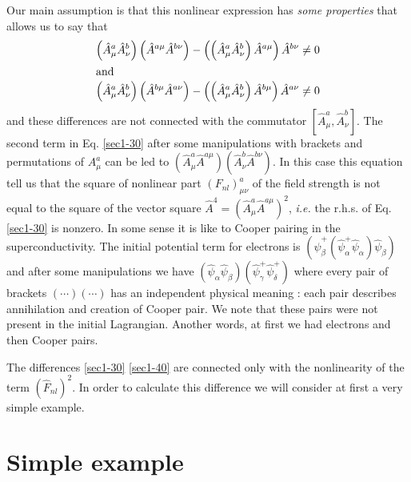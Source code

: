 \documentclass[a4paper,a4paper]{article}
\begin{document}
Our main assumption is that this nonlinear expression has 
\textit{some properties} that allows us to say that 
\begin{align}
\left (
\hat A^a_\mu \hat A^b_\nu
\right )
\left (
\hat A^{a\mu} \hat A^{b\nu}
\right ) - 
\left ( \left (
\hat A^a_\mu \hat A^b_\nu \right )
\hat A^{a\mu} \right ) \hat A^{b\nu} \neq 0 
\label{sec1-30}\\
\intertext{and}
\left (
\hat A^a_\mu \hat A^b_\nu
\right )
\left (
\hat A^{b\mu} \hat A^{a\nu}
\right ) - 
\left ( \left (
\hat A^a_\mu \hat A^b_\nu 
\right )
\hat A^{b\mu} \right )\hat A^{a\nu} \neq 0 
\label{sec1-40}
\end{align}
and these differences are not connected with the commutator  
$[\hat A^a_\mu , \hat A^b_\nu]$. The second term in Eq. \eqref{sec1-30} 
after some manipulations with 
brackets and permutations of $A^a_\mu$ can be led to 
$(\hat A^a_\mu \hat A^{a \mu})(\hat A^b_\nu \hat A^{b \nu})$. 
In this case this equation 
tell us that the square of nonlinear part $(F_{nl})^a_{\mu \nu}$ 
of the field strength is not equal to the square of the vector 
square $\hat A^4 = (\hat A^a_\mu \hat A^{a\mu})^2$, 
\textit{i.e.} the r.h.s. of Eq. \eqref{sec1-30} is nonzero. 
In some sense it is like to Cooper pairing in the superconductivity. 
The initial potential term for electrons is 
$\left (\hat\psi^+_\beta \left ( \hat\psi^+_\alpha \hat\psi_\alpha
\right ) \hat\psi_\beta \right )$ and after some manipulations 
we have 
$
\left (
\hat\psi_\alpha \hat\psi_\beta 
  \right ) 
\left (
\hat\psi^+_\gamma \hat\psi^+_\delta 
\right ) 
$
where every pair of brackets $(\cdots )(\cdots )$ has an independent 
physical meaning : each pair describes 
annihilation and creation of Cooper pair. We note that these pairs were 
not present in the initial Lagrangian. Another words, at first we had 
electrons and then Cooper pairs.  
\par 
The differences \eqref{sec1-30} \eqref{sec1-40} are connected only with 
the nonlinearity of the term $(\hat F_{nl})^2$. In order to calculate 
this difference we will consider at first a very simple example. 

\section{Simple example}
\end{document}
